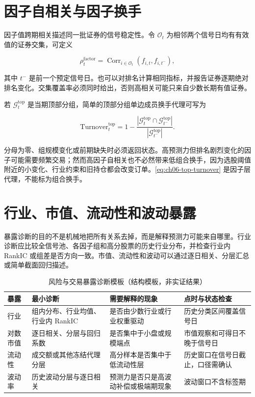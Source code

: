 \section{因子自相关与因子换手}

因子值跨期相关描述同一批证券的信号稳定性。令
\(\mathcal{O}_t\) 为相邻两个信号日均有有效值的证券交集，可定义

\begin{equation}
  \rho^{\mathrm{factor}}_t
  =
  \operatorname{Corr}_{i\in\mathcal{O}_t}
  \left(f_{i,t},f_{i,t^-}\right),
  \label{eq:ch06-factor-autocorr}
\end{equation}

其中 \(t^-\) 是前一个预定信号日。也可以对排名计算相同指标，并报告证券逐期绝对排名变化。交集覆盖率必须同时给出，否则高相关可能只来自少数长期有值证券。

若 \(\mathcal{G}^{\mathrm{top}}_t\) 是当期顶部分组，简单的顶部分组单边成员换手代理可写为

\begin{equation}
  \mathrm{Turnover}^{\mathrm{top}}_t
  =
  1-
  \frac{
    \left|\mathcal{G}^{\mathrm{top}}_t
    \cap \mathcal{G}^{\mathrm{top}}_{t^-}\right|
  }{
    \left|\mathcal{G}^{\mathrm{top}}_{t^-}\right|
  }.
  \label{eq:ch06-top-turnover}
\end{equation}

分母为零、组规模变化或前期缺失时必须返回状态。高预测力但排名剧烈变化的因子可能需要频繁交易；然而高因子自相关也不必然带来低组合换手，因为选股阈值附近的小变化、行业约束和旧持仓都会改变订单。\cref{eq:ch06-top-turnover} 是因子层代理，不能标为组合换手。

\section{行业、市值、流动性和波动暴露}

暴露诊断的目的不是机械地把所有关系去掉，而是解释预测力可能来自哪里。行业诊断应比较全信号池、各因子组和高分股票的历史行业分布，并检查行业内 RankIC 或组差是否方向一致。市值、流动性和波动可以通过逐日相关、分层汇总或简单截面回归描述。

\begin{table}[htbp]
  \centering
  \small
  \caption{风险与交易暴露诊断模板（结构模板，非实证结果）}
  \label{tab:ch06-exposure-template}
  \begin{tabularx}{\textwidth}{p{2.0cm} p{3.0cm} p{3.1cm} Y}
    \toprule
    暴露 & 最小诊断 & 需要解释的现象 & 点时与状态检查 \\
    \midrule
    行业 & 组内分布、行业均值、行业内 RankIC & 是否由少数行业或行业权重驱动 & 历史分类区间覆盖信号日 \\
    对数市值 & 逐日相关、分层与回归系数 & 是否集中于小盘或规模端点 & 市值观察和可得日不晚于信号日 \\
    流动性 & 成交额或其他冻结代理分层 & 高分样本是否集中于低流动性层 & 历史窗口在信号日截止，口径需确认 \\
    波动率 & 历史波动分层与逐日相关 & 预测力是否只是高波动补偿或极端期现象 & 波动窗口不含标签期 \\
    \bottomrule
  \end{tabularx}
\end{table}

